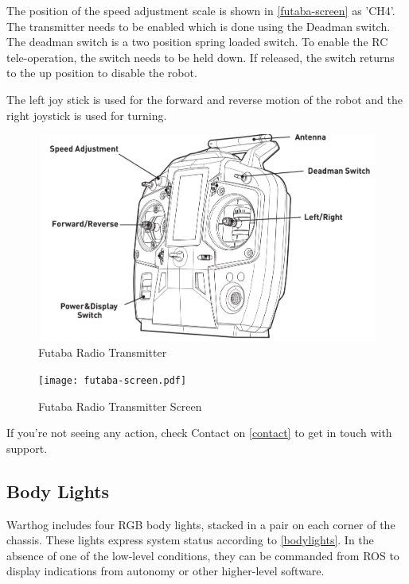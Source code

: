 \documentclass[]{clearpath-latex/clearpath-manual}
\begin{document}
The position of the speed adjustment scale is shown in \autoref{futaba-screen} as 'CH4'.
The transmitter needs to be enabled which is done using the Deadman switch.  The deadman switch is a two position spring loaded switch.  To enable the RC tele-operation, the switch needs to be held down.  If released, the switch returns to the up position to disable the robot.

The left joy stick is used for the forward and reverse motion of the robot and the right joystick is used for turning.

\begin{figure}[!h]
  \centering
  \includegraphics[width=1.0\linewidth]{futaba.png}
  \caption{Futaba Radio Transmitter}
  \label{futaba}
\end{figure}

\begin{figure}[!h]
  \centering
  \texttt{[image: futaba-screen.pdf]}
  \caption{Futaba Radio Transmitter Screen}
  \label{futaba-screen}
\end{figure}

If you’re not seeing any action, check Contact on \autoref{contact} to get in touch with support.


\pagebreak[4]

\subsection{Body Lights}

Warthog includes four RGB body lights, stacked in a pair on each corner of the chassis. These lights express system status according to \autoref{bodylights}. In the absence of one of the low-level conditions, they can be commanded from ROS to display indications from autonomy or other higher-level software.
\end{document}
